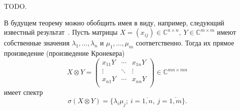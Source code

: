 TODO.

В будущем теорему можно обобщить имея в виду, например,
следующий известный результат~\cite{bellman-matrices-kron}.
Пусть матрицы \( X{=}(x_{ij})\in\mathbb{C}^{n\times n},\ Y\in\mathbb{C}^{m\times m} \)
имеют собственные значения
\( \lambda_1, \ldots, \lambda_n \)
и \( \mu_1, \ldots, \mu_m \) соответственно.
Тогда их прямое произведение (произведение Кронекера)
\[
    X\otimes Y =
    \begin{pmatrix}
        x_{11} Y & \cdots & x_{1n} Y \\
        \vdots & \ddots & \vdots \\
        x_{n1} Y & \cdots & x_{nn} Y \\
    \end{pmatrix}\in\mathbb{C}^{mn\times mn}
    \]
имеет спектр
\[
    \sigma(X\otimes Y) = \{ \lambda_i \mu _j;\ i=\overline{1,n},\ j=\overline{1,m} \}.
    \]
